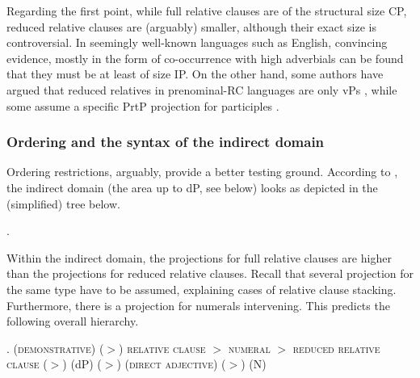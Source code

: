 \documentclass [output=book,colorlinks,citecolor=brown]{langscibook}
\begin{document}
Regarding the first point, while full relative clauses are of the structural size CP, reduced relative clauses are (arguably) smaller, although their exact size is controversial. In seemingly well-known languages such as English, convincing evidence, mostly in the form of co-occurrence with high adverbials \citep{douglas:2016:syntactic, harwood:2018:rrc, cinque:2020:relcl} can be found that they must be at least of size IP. On the other hand, some authors have argued that reduced relatives in prenominal-RC languages are only vPs \citep{krause:2001:rrc}, while some assume a specific PrtP projection for participles \citep{bhatt:1999:covert}.

\subsubsection{Ordering and the syntax of the indirect domain}

Ordering restrictions, arguably, provide a better testing ground. According to \citet{cinque:2010:adj, cinque:2020:relcl}, the indirect domain (the area up to dP, see below) looks as depicted in the (simplified) tree below.

\ex. 

Within the indirect domain, the projections for full relative clauses are higher than the projections for reduced relative clauses. Recall that several projection for the same type have to be assumed, explaining cases of relative clause stacking. Furthermore, there is a projection for numerals intervening. This predicts the following overall hierarchy. %

\ex. (\textsc{demonstrative}) ($>$) \textsc{relative clause} $>$ \textsc{numeral} $>$ \textsc{reduced relative clause} ($>$) (dP) ($>$) (\textsc{direct adjective}) ($>$) (N)
\end{document}

